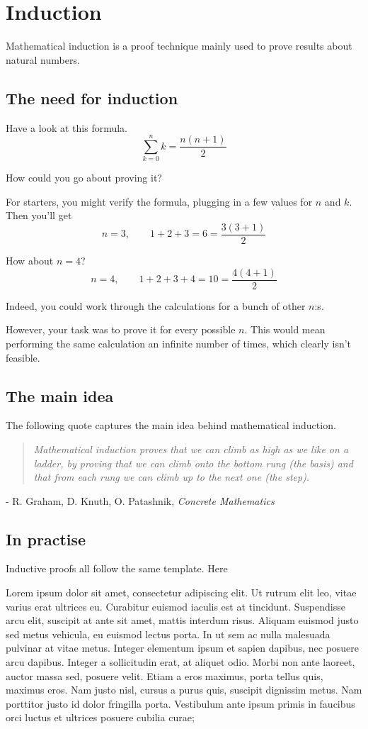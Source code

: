 \documentclass{scrreprt}
\newcommand{\somequote}[3]{\begin{quotation} \textit{#1} \end{quotation} \begin{flushright} - #2, \textit{#3}\end{flushright} }
\begin{document}
\section{Induction}

Mathematical induction is a proof technique mainly used to prove results about natural numbers.

\subsection*{The need for induction}

Have a look at this formula.
$$\sum_{k = 0}^n k = \frac{n(n + 1)}{2}$$

How could you go about proving it?

For starters, you might verify the formula, plugging in a few values for $n$ and $k$. Then you'll get
$$n = 3, \qquad 1 + 2 + 3 = 6 = \frac{3(3 + 1)}{2}$$

How about $n = 4$?
$$n = 4, \qquad 1 + 2 + 3 + 4 = 10 = \frac{4(4 + 1)}{2}$$

Indeed, you could work through the calculations for a bunch of other $n$:s.

However, your task was to prove it for every possible $n$. This would mean performing the same calculation an infinite number of times, which clearly isn't feasible.

\subsection*{The main idea}

The following quote captures the main idea behind mathematical induction.

\somequote{Mathematical induction proves that we can climb as high as we like on a ladder, by proving that we can climb onto the bottom rung (the basis) and that from each rung we can climb up to the next one (the step).}{R. Graham, D. Knuth, O. Patashnik}{Concrete Mathematics}

\subsection*{In practise}

Inductive proofs all follow the same template. Here

Lorem ipsum dolor sit amet, consectetur adipiscing elit. Ut rutrum elit leo, vitae varius erat ultrices eu. Curabitur euismod iaculis est at tincidunt. Suspendisse arcu elit, suscipit at ante sit amet, mattis interdum risus. Aliquam euismod justo sed metus vehicula, eu euismod lectus porta. In ut sem ac nulla malesuada pulvinar at vitae metus. Integer elementum ipsum et sapien dapibus, nec posuere arcu dapibus. Integer a sollicitudin erat, at aliquet odio. Morbi non ante laoreet, auctor massa sed, posuere velit. Etiam a eros maximus, porta tellus quis, maximus eros. Nam justo nisl, cursus a purus quis, suscipit dignissim metus. Nam porttitor justo id dolor fringilla porta. Vestibulum ante ipsum primis in faucibus orci luctus et ultrices posuere cubilia curae;
\end{document}
